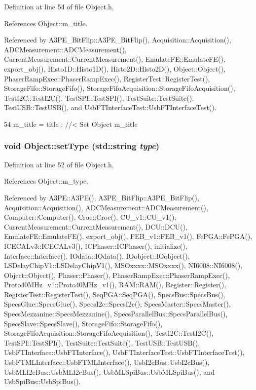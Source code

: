 Definition at line 54 of file Object.h.

References Object::m\_\-title.

Referenced by A3PE\_\-BitFlip::A3PE\_\-BitFlip(), Acquisition::Acquisition(), ADCMeasurement::ADCMeasurement(), CurrentMeasurement::CurrentMeasurement(), EmulateFE::EmulateFE(), export\_\-obj(), Histo1D::Histo1D(), Histo2D::Histo2D(), Object::Object(), PhaserRampExec::PhaserRampExec(), RegisterTest::RegisterTest(), StorageFifo::StorageFifo(), StorageFifoAcquisition::StorageFifoAcquisition(), TestI2C::TestI2C(), TestSPI::TestSPI(), TestSuite::TestSuite(), TestUSB::TestUSB(), and UsbFTInterfaceTest::UsbFTInterfaceTest().


\begin{DoxyCode}
54 { m_title = title ; } //< Set Object m_title
\end{DoxyCode}
\hypertarget{classObject_aae534cc9d982bcb9b99fd505f2e103a5}{
\subsubsection[{setType}]{\setlength{\rightskip}{0pt plus 5cm}void Object::setType (std::string {\em type})}}
\label{classObject_aae534cc9d982bcb9b99fd505f2e103a5}


Definition at line 52 of file Object.h.

References Object::m\_\-type.

Referenced by A3PE::A3PE(), A3PE\_\-BitFlip::A3PE\_\-BitFlip(), Acquisition::Acquisition(), ADCMeasurement::ADCMeasurement(), Computer::Computer(), Croc::Croc(), CU\_\-v1::CU\_\-v1(), CurrentMeasurement::CurrentMeasurement(), DCU::DCU(), EmulateFE::EmulateFE(), export\_\-obj(), FEB\_\-v1::FEB\_\-v1(), FePGA::FePGA(), ICECALv3::ICECALv3(), ICPhaser::ICPhaser(), initialize(), Interface::Interface(), IOdata::IOdata(), IOobject::IOobject(), LSDelayChipV1::LSDelayChipV1(), MSOxxxx::MSOxxxx(), NI6008::NI6008(), Object::Object(), Phaser::Phaser(), PhaserRampExec::PhaserRampExec(), Proto40MHz\_\-v1::Proto40MHz\_\-v1(), RAM::RAM(), Register::Register(), RegisterTest::RegisterTest(), SeqPGA::SeqPGA(), SpecsBus::SpecsBus(), SpecsGlue::SpecsGlue(), SpecsI2c::SpecsI2c(), SpecsMaster::SpecsMaster(), SpecsMezzanine::SpecsMezzanine(), SpecsParallelBus::SpecsParallelBus(), SpecsSlave::SpecsSlave(), StorageFifo::StorageFifo(), StorageFifoAcquisition::StorageFifoAcquisition(), TestI2C::TestI2C(), TestSPI::TestSPI(), TestSuite::TestSuite(), TestUSB::TestUSB(), UsbFTInterface::UsbFTInterface(), UsbFTInterfaceTest::UsbFTInterfaceTest(), UsbFTMLInterface::UsbFTMLInterface(), UsbI2cBus::UsbI2cBus(), UsbMLI2cBus::UsbMLI2cBus(), UsbMLSpiBus::UsbMLSpiBus(), and UsbSpiBus::UsbSpiBus().


